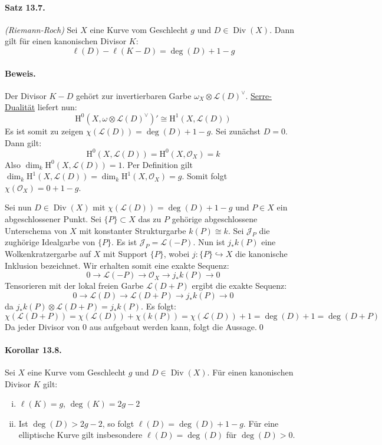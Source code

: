 \paragraph{Satz 13.7.}\label{13.7} \textit{(Riemann-Roch)} Sei $X$ eine Kurve vom Geschlecht $g$ und $D\in\operatorname{Div}(X)$. Dann gilt für einen kanonischen Divisor $K$:
\[\ell(D)-\ell(K-D) = \deg(D)+1-g \]

\paragraph{Beweis.} Der Divisor $K-D$ gehört zur invertierbaren Garbe $\omega_X\otimes\mathcal{L}(D)^\vee$. \hyperref[12.10]{Serre-Dualität} liefert nun:
\[\mathrm{H}^0(X,\omega\otimes\mathcal{L}(D)^\vee)' \cong\mathrm{H}^1(X,\mathcal{L}(D)) \]
Es ist somit zu zeigen $\chi(\mathcal{L}(D))=\deg(D)+1-g$. Sei zunächst $D=0$. Dann gilt:
\[\mathrm{H}^0(X,\mathcal{L}(D))=\mathrm{H}^0(X,\mathcal{O}_X)=k \]
Also $\dim_k\mathrm{H}^0(X,\mathcal{L}(D))=1$. Per Definition gilt $\dim_k\mathrm{H}^1(X,\mathcal{L}(D))=\dim_k\mathrm{H}^1(X,\mathcal{O}_X)=g$. Somit folgt $\chi(\mathcal{O}_X)=0+1-g$.

Sei nun $D\in\operatorname{Div}(X)$ mit $\chi(\mathcal{L}(D))=\deg(D)+1-g$ und $P\in X$ ein abgeschlossener Punkt. Sei $\{P\}\subset X$ das zu $P$ gehörige abgeschlossene Unterschema von $X$ mit konstanter Strukturgarbe $k(P)\cong k$. Sei $\mathcal{J}_P$ die zughörige Idealgarbe von $\{P\}$. Es ist $\mathcal{J}_P=\mathcal{L}(-P)$. Nun ist $j_\ast k(P)$ eine Wolkenkratzergarbe auf $X$ mit Support $\{P\}$, wobei $j:\{P\}\hookrightarrow X$ die kanonische Inklusion bezeichnet. Wir erhalten somit eine exakte Sequenz:
\[0\longrightarrow\mathcal{L}(-P)\longrightarrow\mathcal{O}_X\longrightarrow j_\ast k(P)\longrightarrow 0 \]
Tensorieren mit der lokal freien Garbe $\mathcal{L}(D+P)$ ergibt die exakte Sequenz:
\[0\longrightarrow\mathcal{L}(D)\longrightarrow\mathcal{L}(D+P)\longrightarrow j_\ast k(P)\longrightarrow 0 \]
da $j_\ast k(P)\otimes\mathcal{L}(D+P)=j_\ast k(P)$. Es folgt:
\[\chi(\mathcal{L}(D+P)) = \chi(\mathcal{L}(D)) + \chi(k(P))=\chi(\mathcal{L}(D))+1 = \deg(D)+1 = \deg(D+P) \]
Da jeder Divisor von $0$ aus aufgebaut werden kann, folgt die Aussage.\qed

\paragraph{Korollar 13.8.}\label{13.8} Sei $X$ eine Kurve vom Geschlecht $g$ und $D\in\operatorname{Div}(X)$. Für einen kanonischen Divisor $K$ gilt:
\begin{enumerate}[(i)]
\item $\ell(K)=g$, $\deg(K)=2g-2$
\item Ist $\deg(D)>2g-2$, so folgt $\ell(D)=\deg(D)+1-g$. Für eine elliptische Kurve gilt insbesondere $\ell(D)=\deg(D)$ für $\deg(D)>0$.
\end{enumerate}

